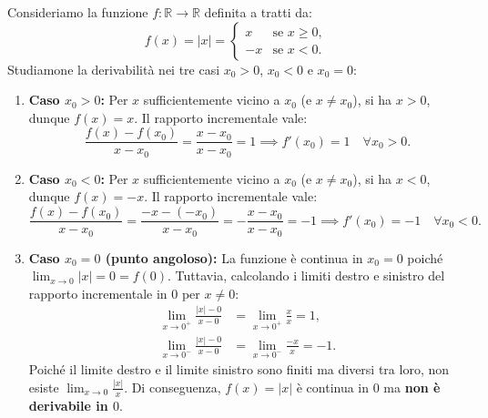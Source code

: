 \begin{esbox}[Controesempio — La funzione valore assoluto $f(x) = |x|$]
Consideriamo la funzione $f \colon \mathbb{R} \to \mathbb{R}$ definita a tratti da:
\[
    f(x) = |x| = \begin{cases} x & \text{se } x \ge 0, \\ -x & \text{se } x < 0. \end{cases}
\]
Studiamone la derivabilità nei tre casi $x_0 > 0$, $x_0 < 0$ e $x_0 = 0$:

\begin{enumerate}
    \item \textbf{Caso $x_0 > 0$:} Per $x$ sufficientemente vicino a $x_0$ (e $x \neq x_0$), si ha $x > 0$, dunque $f(x) = x$. Il rapporto incrementale vale:
    \[
        \frac{f(x) - f(x_0)}{x - x_0} = \frac{x - x_0}{x - x_0} = 1 \implies f'(x_0) = 1 \quad \forall x_0 > 0.
    \]
    \item \textbf{Caso $x_0 < 0$:} Per $x$ sufficientemente vicino a $x_0$ (e $x \neq x_0$), si ha $x < 0$, dunque $f(x) = -x$. Il rapporto incrementale vale:
    \[
        \frac{f(x) - f(x_0)}{x - x_0} = \frac{-x - (-x_0)}{x - x_0} = -\frac{x - x_0}{x - x_0} = -1 \implies f'(x_0) = -1 \quad \forall x_0 < 0.
    \]
    \item \textbf{Caso $x_0 = 0$ (punto angoloso):} La funzione è continua in $x_0 = 0$ poiché $\lim_{x \to 0} |x| = 0 = f(0)$. Tuttavia, calcolando i limiti destro e sinistro del rapporto incrementale in $0$ per $x \neq 0$:
    \begin{align*}
        \lim_{x \to 0^+} \frac{|x| - 0}{x - 0} &= \lim_{x \to 0^+} \frac{x}{x} = 1, \\
        \lim_{x \to 0^-} \frac{|x| - 0}{x - 0} &= \lim_{x \to 0^-} \frac{-x}{x} = -1.
    \end{align*}
    Poiché il limite destro e il limite sinistro sono finiti ma diversi tra loro, non esiste $\lim_{x \to 0} \frac{|x|}{x}$. Di conseguenza, $f(x) = |x|$ è continua in $0$ ma \textbf{non è derivabile in $0$}.
\end{enumerate}

\begin{center}
\end{center}
\end{esbox}
